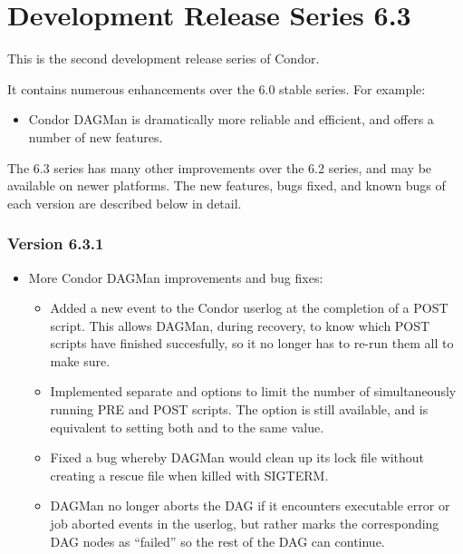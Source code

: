 \section{\label{sec:History-6-3}Development Release Series 6.3}

This is the second development release series of Condor.

It contains numerous enhancements over the 6.0 stable series.
For example:

\begin{itemize}

\item 
Condor DAGMan is dramatically more reliable and efficient, and offers
a number of new features.

\end{itemize}

The 6.3 series has many other improvements over the 6.2 series, and
may be available on newer platforms.  The new features, bugs fixed,
and known bugs of each version are described below in detail.


\subsubsection{\label{sec:New-6-3-1}Version 6.3.1}

\begin{itemize}

\item
More Condor DAGMan improvements and bug fixes:

\begin{itemize}

\item
Added a new event to the Condor userlog at the completion of a POST
script.  This allows DAGMan, during recovery, to know which POST
scripts have finished succesfully, so it no longer has to re-run them
all to make sure.

\item
Implemented separate  and  options to limit
the number of simultaneously running PRE and POST scripts.  The
 option is still available, and is equivalent to
setting both  and  to the same value.

\item
Fixed a bug whereby DAGMan would clean up its lock file without
creating a rescue file when killed with SIGTERM.

\item
DAGMan no longer aborts the DAG if it encounters executable error or
job aborted events in the userlog, but rather marks the corresponding
DAG nodes as ``failed'' so the rest of the DAG can continue.

\end{itemize}

\end{itemize}


